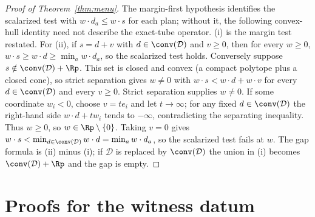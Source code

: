 \begin{proof}[Proof of Theorem~\ref{thm:menu}]
The margin-first hypothesis identifies the scalarized test with $w\cdot d_a\le w\cdot s$ for each plan; without it, the following convex-hull identity need not describe the exact-tube operator. (i) is the margin test restated. For (ii), if $s=d+v$ with $d\in\conv(\mathcal D)$ and $v\ge0$, then for every $w\ge0$, $w\cdot s\ge w\cdot d\ge\min_aw\cdot d_a$, so the scalarized test holds. Conversely suppose $s\notin\conv(\mathcal D)+\Rp$. This set is closed and convex (a compact polytope plus a closed cone), so strict separation gives $w\ne0$ with $w\cdot s<w\cdot d+w\cdot v$ for every $d\in\conv(\mathcal D)$ and every $v\ge0$. Strict separation supplies $w\ne0$. If some coordinate $w_i<0$, choose $v=t e_i$ and let $t\to\infty$; for any fixed $d\in\conv(\mathcal D)$ the right-hand side $w\cdot d+t w_i$ tends to $-\infty$, contradicting the separating inequality. Thus $w\ge0$, so $w\in\Rp\setminus\{0\}$. Taking $v=0$ gives $w\cdot s<\min_{d\in\conv(\mathcal D)}w\cdot d=\min_aw\cdot d_a$, so the scalarized test fails at $w$. The gap formula is (ii) minus (i); if $\mathcal D$ is replaced by $\conv(\mathcal D)$ the union in (i) becomes $\conv(\mathcal D)+\Rp$ and the gap is empty.
\end{proof}

\section{Proofs for the witness datum}\label{app:witness}

